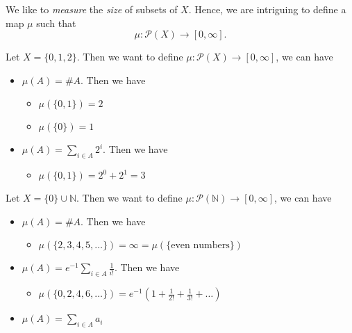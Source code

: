 We like to \emph{measure} the \emph{size} of subsets of \(X\). Hence, we are intriguing to define a map \(\mu\) such that
\[
	\mu\colon \mathcal{P}(X) \to \left[0, \infty\right].
\]
\begin{eg}
	Let \(X = \{0, 1, 2\}\). Then we want to define \(\mu\colon \mathcal{P}(X)\to \left[0, \infty\right] \), we can have
	\begin{itemize}
		\item \(\mu(A) = \# A\). Then we have
		      \begin{itemize}
			      \item \(\mu(\{0, 1\}) = 2\)
			      \item \(\mu(\{0\}) = 1\)
		      \end{itemize}
		\item \(\mu(A) = \sum\limits_{i\in A} 2^i\). Then we have
		      \begin{itemize}
			      \item \(\mu(\{0, 1\}) = 2^0 + 2^1 = 3\)
		      \end{itemize}
	\end{itemize}
\end{eg}
\begin{eg}
	Let \(X = \{0\}\cup \mathbb{N} \). Then we want to define \(\mu\colon \mathcal{P}(\mathbb{N} )\to \left[0, \infty\right] \), we can have
	\begin{itemize}
		\item \(\mu(A) = \# A\). Then we have
		      \begin{itemize}
			      \item \(\mu(\{2, 3, 4, 5, \ldots  \}) = \infty = \mu(\{\text{even numbers} \})\)
		      \end{itemize}
		\item \(\mu(A) = e^{-1}\sum\limits_{i\in A}\frac{1}{i!}\). Then we have
		      \begin{itemize}
			      \item \(\mu(\{0, 2, 4, 6, \ldots \}) = e^{-1} \left(1+\frac{1}{2!}+\frac{1}{3!}+\ldots  \right)\)
		      \end{itemize}
		\item \(\mu(A) = \sum\limits_{i\in A} a_{i}\)
	\end{itemize}
\end{eg}
